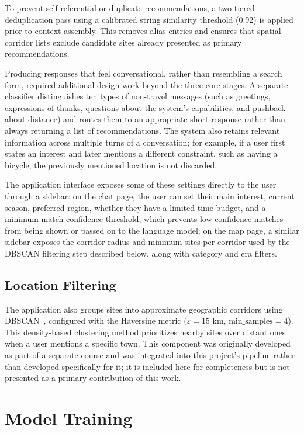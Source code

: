 \documentclass[conference]{IEEEtran}
\begin{document}
To prevent self-referential or duplicate recommendations, a two-tiered deduplication pass using a calibrated string similarity threshold ($0.92$) is applied prior to context assembly. This removes alias entries and ensures that spatial corridor lists exclude candidate sites already presented as primary recommendations.

Producing responses that feel conversational, rather than resembling a search form, required additional design work beyond the three core stages. A separate classifier distinguishes ten types of non-travel messages (such as greetings, expressions of thanks, questions about the system's capabilities, and pushback about distance) and routes them to an appropriate short response rather than always returning a list of recommendations. The system also retains relevant information across multiple turns of a conversation; for example, if a user first states an interest and later mentions a different constraint, such as having a bicycle, the previously mentioned location is not discarded.

The application interface exposes some of these settings directly to the user through a sidebar: on the chat page, the user can set their main interest, current season, preferred region, whether they have a limited time budget, and a minimum match confidence threshold, which prevents low-confidence matches from being shown or passed on to the language model; on the map page, a similar sidebar exposes the corridor radius and minimum sites per corridor used by the DBSCAN filtering step described below, along with category and era filters.

\subsection{Location Filtering}
The application also groups sites into approximate geographic corridors using DBSCAN~\cite{dbscan}, configured with the Haversine metric ($\varepsilon = 15\text{ km}$, $\text{min\_samples} = 4$). This density-based clustering method prioritizes nearby sites over distant ones when a user mentions a specific town. This component was originally developed as part of a separate course and was integrated into this project's pipeline rather than developed specifically for it; it is included here for completeness but is not presented as a primary contribution of this work.

\section{Model Training}
\end{document}
